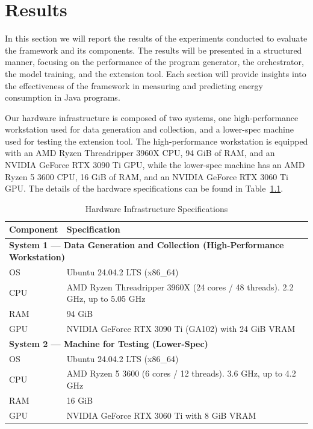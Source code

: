 \chapter{Results}\label{chapter:results}


In this section we will report the results of the experiments conducted to evaluate the framework and its components. The results will be presented in a structured manner, focusing on the performance of the program generator, the orchestrator, the model training, and the extension tool. Each section will provide insights into the effectiveness of the framework in measuring and predicting energy consumption in Java programs.

Our hardware infrastructure is composed of two systems, one high-performance workstation used for data generation and collection, and a lower-spec machine used for testing the extension tool. The high-performance workstation is equipped with an AMD Ryzen Threadripper 3960X CPU, 94 GiB of RAM, and an NVIDIA GeForce RTX 3090 Ti GPU, while the lower-spec machine has an AMD Ryzen 5 3600 CPU, 16 GiB of RAM, and an NVIDIA GeForce RTX 3060 Ti GPU. The details of the hardware specifications can be found in Table~\ref{tab:hardware_specs}.

\begin{table}[htbp]
  \small
  \centering
  \caption{Hardware Infrastructure Specifications}
  \label{tab:hardware_specs}
  \begin{tabularx}{\textwidth}{l X}
    \toprule
    \textbf{Component} & \textbf{Specification} \\
    \midrule
    \multicolumn{2}{l}{\textbf{System 1 — Data Generation and Collection (High-Performance Workstation)}} \\
    \cmidrule(r){1-2}
    OS & Ubuntu 24.04.2 LTS (x86\_64) \\
    CPU                 & AMD Ryzen Threadripper 3960X (24 cores / 48 threads). 2.2 GHz, up to 5.05 GHz \\
    RAM                 & 94 GiB \\
    GPU                 & NVIDIA GeForce RTX 3090 Ti (GA102) with 24 GiB VRAM \\
    \midrule
    \multicolumn{2}{l}{\textbf{System 2 — Machine for Testing (Lower-Spec)}} \\
    \cmidrule(r){1-2}
    OS                  & Ubuntu 24.04.2 LTS (x86\_64) \\
    CPU                 & AMD Ryzen 5 3600 (6 cores / 12 threads). 3.6 GHz, up to 4.2 GHz \\
    RAM                 & 16 GiB \\
    GPU                 & NVIDIA GeForce RTX 3060 Ti with 8 GiB VRAM \\
    \bottomrule
  \end{tabularx}
\end{table}


